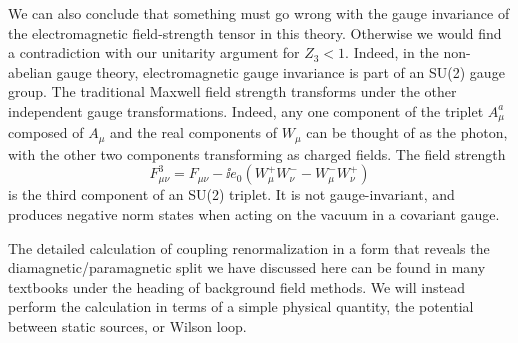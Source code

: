 
We can also conclude that something must go wrong with the gauge invariance of
the electromagnetic field-strength tensor in this theory. Otherwise we would
find a contradiction with our unitarity argument for $Z_3<1$. Indeed, in the
non-abelian gauge theory, electromagnetic gauge invariance is part of an SU(2)
gauge group. The traditional Maxwell field strength transforms under the other
independent gauge transformations. Indeed, any one component of the triplet
$A_\mu^a$ composed of $A_\mu$ and the real components of $W_\mu$ can be thought
of as the photon, with the other two components transforming as charged fields.
The field strength
\[
  F^3_{\mu\nu}=F_{\mu\nu}-\ii e_0
  (W_\mu^+W_\nu^- - W_\mu^-W_\nu^+)
\]
is the third component of an SU(2) triplet. It is not gauge-invariant, and
produces negative norm states when acting on the vacuum in a covariant gauge.

The detailed calculation of coupling renormalization in a form that reveals the
diamagnetic/paramagnetic split we have discussed here can be found in many
textbooks under the heading of background field methods. We will instead
perform the calculation in terms of a simple physical quantity, the potential
between static sources, or Wilson loop.
